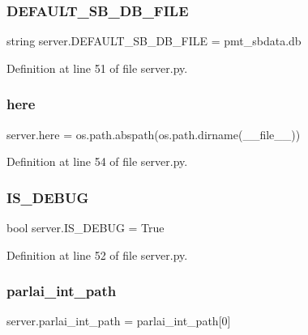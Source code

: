 \subsubsection{\texorpdfstring{D\+E\+F\+A\+U\+L\+T\+\_\+\+S\+B\+\_\+\+D\+B\+\_\+\+F\+I\+LE}{DEFAULT\_SB\_DB\_FILE}}
{\footnotesize\ttfamily string server.\+D\+E\+F\+A\+U\+L\+T\+\_\+\+S\+B\+\_\+\+D\+B\+\_\+\+F\+I\+LE = \textquotesingle{}pmt\+\_\+sbdata.\+db\textquotesingle{}}



Definition at line 51 of file server.\+py.

\mbox{\label{namespaceserver_a3ed884cbe61302d8889e5f7495bb60e4}} 
\subsubsection{\texorpdfstring{here}{here}}
{\footnotesize\ttfamily server.\+here = os.\+path.\+abspath(os.\+path.\+dirname(\+\_\+\+\_\+file\+\_\+\+\_\+))}



Definition at line 54 of file server.\+py.

\mbox{\label{namespaceserver_a4da0f891642a0631c5baf8dec244ef4a}} 
\subsubsection{\texorpdfstring{I\+S\+\_\+\+D\+E\+B\+UG}{IS\_DEBUG}}
{\footnotesize\ttfamily bool server.\+I\+S\+\_\+\+D\+E\+B\+UG = True}



Definition at line 52 of file server.\+py.

\mbox{\label{namespaceserver_a74bacf9786854a2e0d38291f46a4f0a5}} 
\subsubsection{\texorpdfstring{parlai\+\_\+int\+\_\+path}{parlai\_int\_path}}
{\footnotesize\ttfamily server.\+parlai\+\_\+int\+\_\+path = parlai\+\_\+int\+\_\+path\mbox{[}0\mbox{]}}



